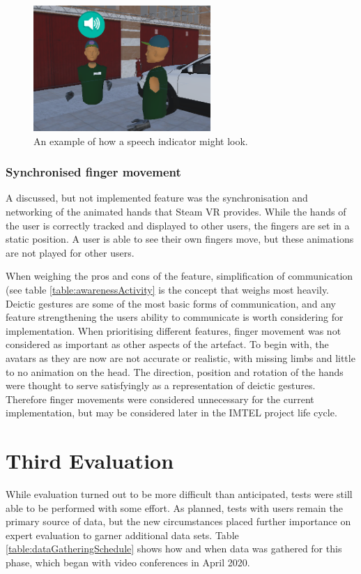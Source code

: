 \begin{figure}[H]
  \centering
   \captionsetup{width=.6\linewidth}
    \includegraphics[width=0.6\textwidth]{fig/phase_3/implementation/speechIndicator.PNG}
 \caption{An example of how a speech indicator might look.}
\label{fig:phase3_speech}
\end{figure}


\subsubsection{Synchronised finger movement}
A discussed, but not implemented feature was the synchronisation and networking of the animated hands that Steam VR provides. While the hands of the user is correctly tracked and displayed to other users, the fingers are set in a static position. A user is able to see their own fingers move, but these animations are not played for other users.

When weighing the pros and cons of the feature, simplification of communication (see table \ref{table:awarenessActivity} is the concept that weighs most heavily. Deictic gestures are some of the most basic forms of communication, and any feature strengthening the users ability to communicate is worth considering for implementation. When prioritising different features, finger movement was not considered as important as other aspects of the artefact. To begin with, the avatars as they are now are not accurate or realistic, with missing limbs and little to no animation on the head. The direction, position and rotation of the hands were thought to serve satisfyingly as a representation of deictic gestures. Therefore finger movements were considered unnecessary for the current implementation, but may be considered later in the IMTEL project life cycle.



\section{Third Evaluation}
\label{section:evalPhase3}
While evaluation turned out to be more difficult than anticipated, tests were still able to be performed with some effort. As planned, tests with  users remain the primary source of data, but the new circumstances placed further importance on expert evaluation to garner additional data sets. Table \ref{table:dataGatheringSchedule} shows how and when data was gathered for this phase, which began with video conferences in April 2020. 


